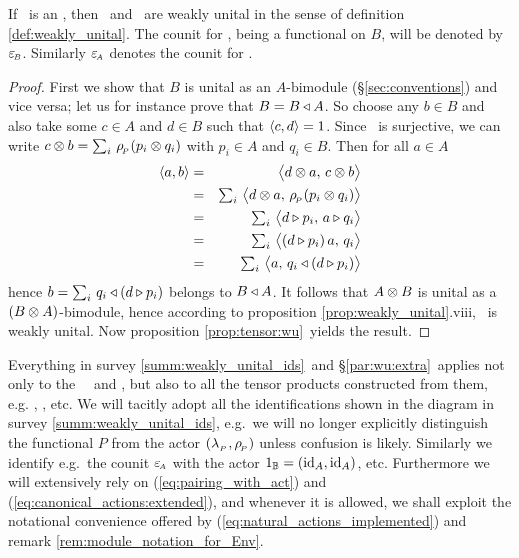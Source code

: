 \begin{prop_sec} \label{prop:idpa:wu}
If\/ \pairAB\ is an \idpa, then \Aa\ and\/ \BB\ are weakly unital in the sense of
definition \ref{def:weakly_unital}\@.
\rm The counit for \Aa, being a functional on $B$, will be denoted by $\varepsilon_{\scriptscriptstyle \! B}$.
    Similarly $\varepsilon_{\scriptscriptstyle \! A}$ denotes the counit for \BB.
\end{prop_sec}
\begin{proof}
First we show that $B$ is unital as an $A$-bimodule (\S\ref{sec:conventions})
and vice versa; let us for instance prove that $B=B\triangleleft A$.
So choose any $b\in B$ and also take some $c\in A$ and $d\in B$ such that $\langle c,d \rangle=1$.
Since \rp\ is surjective, we can write $c \otimes b = \sum_i \,\rho_{_{\!P}} (p_i \otimes q_i)$
with $p_i \in A$ and $q_i \in B$. Then for all $a\in A$
\begin{eqnarray*}
\pair{a}{b} &=& \pairM{d \tens a}{c \tens b}
      \\  &=&  \textstyle \sum_i \,  \pairM{d \tens a}{\rp (p_i \tens q_i)}
      \\  &=&  \textstyle \sum_i \,  \pairM{d \lact p_i}{a \lact q_i}
      \\  &=&  \textstyle \sum_i \,  \pairM{(d \lact p_i)\, a}{q_i}
      \\  &=&  \textstyle \sum_i \,  \pairM{a}{q_i \ract (d \lact p_i)}
\end{eqnarray*}
hence $b=\sum_i \, q_i \triangleleft (d \triangleright p_i)$ belongs to $B\triangleleft A$.
It follows that $A \otimes B$ is unital as a $(B\otimes A)$-bimodule,
hence according to proposition \ref{prop:weakly_unital}.viii, \BBAA\ is weakly unital.
Now proposition \ref{prop:tensor:wu}\ yields the result.
\end{proof}

\begin{cor_sec} \label{cor:hs:everything_is_wu}
Everything in survey \ref{summ:weakly_unital_ids}\ and \S\ref{par:wu:extra}\
applies not only to the \contexts\ \Aa\ and\/ \BB, but also to all the
tensor products constructed from them, e.g.\/ \BBAA, \AAAA, etc.
\rm We will tacitly adopt all the identifications shown in the diagram in
    survey \ref{summ:weakly_unital_ids}, e.g.\ we will no longer explicitly
    distinguish the functional $P$ from the actor $(\lambda_{_P\!}\,,\rho_{_{\!P}})$ unless confusion is likely.
    Similarly we identify e.g.\ the counit $\varepsilon_{\scriptscriptstyle \! A}$ with the actor $1_{\mathbb{B}} =(\mbox{\rm id}_A,\mbox{\rm id}_A)$, etc.
    Furthermore we will extensively rely on (\ref{eq:pairing_with_act}) and
    (\ref{eq:canonical_actions:extended}),
    and whenever it is allowed, we shall exploit the notational convenience offered by
    (\ref{eq:natural_actions_implemented}) and remark \ref{rem:module_notation_for_Env}\@.
\end{cor_sec}


